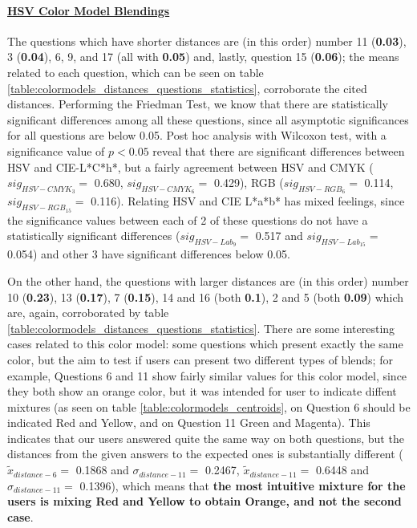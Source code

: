 \paragraph{\ul{HSV Color Model Blendings}} \par
\label{par:hsvcolormodel}
%
The questions which have shorter distances are (in this order) number 11 (\textbf{0.03}), 3 (\textbf{0.04}), 6, 9, and 17 (all with \textbf{0.05}) and, lastly, question 15 (\textbf{0.06}); the means related to each question, which can be
seen on table \ref{table:colormodels_distances_questions_statistics}, corroborate the cited distances. Performing the Friedman Test, we know that there are statistically significant differences among all these questions, since all asymptotic
significances for all questions are below 0.05. Post hoc analysis with Wilcoxon test, with a significance value of $p < 0.05$ reveal that there are significant differences between HSV and CIE-L*C*h*, but a fairly agreement between HSV and CMYK
($sig_{HSV-CMYK_3} = $ 0.680, $sig_{HSV-CMYK_6} = $ 0.429), RGB ($sig_{HSV-RGB_6} = $ 0.114, $sig_{HSV-RGB_15} = $ 0.116). Relating HSV and CIE L*a*b* has mixed feelings, since the significance values between each of 2
of these questions do not have a statistically significant differences ($sig_{HSV-Lab_9} = $ 0.517 and $sig_{HSV-Lab_15} = $ 0.054) and other 3 have significant differences below 0.05. \par
%
On the other hand, the questions with larger distances are (in this order) number 10 (\textbf{0.23}), 13 (\textbf{0.17}), 7 (\textbf{0.15}), 14 and 16 (both \textbf{0.1}), 2 and
5 (both \textbf{0.09}) which are, again, corroborated by table \ref{table:colormodels_distances_questions_statistics}. There are some interesting cases related to this color model: some questions which present exactly the same color, but the aim to test if users can present
two different types of blends; for example, Questions 6 and 11 show fairly similar values for this color model, since they both show an orange color, but it was intended for user to indicate diffent mixtures (as seen on table \ref{table:colormodels_centroids}, on Question 6 should be
indicated Red and Yellow, and on Question 11 Green and Magenta). This indicates that our users answered quite the same way on both questions, but the distances from the given answers to the expected ones is substantially different ($\tilde{x}_{distance-6} = $ 0.1868 and
$\sigma_{distance-11} = $ 0.2467, $\tilde{x}_{distance-11} = $ 0.6448 and $\sigma_{distance-11} = $ 0.1396), which means that \textbf{the most intuitive mixture for the users is mixing Red and Yellow to obtain Orange, and not the second case}. \par
